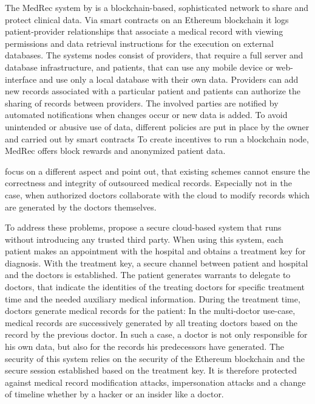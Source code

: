 The MedRec system by \citeauthor{Azaria2016} is a blockchain-based, sophisticated network to share and protect clinical data. Via smart contracts on an Ethereum blockchain it logs patient-provider relationships that associate a medical record with viewing permissions and data retrieval instructions for the execution on external databases.
The systems nodes consist of providers, that require a full server and database infrastructure, and patients, that can use any mobile device or web-interface and use only a local database with their own data.
Providers can add new records associated with a particular patient and patients can authorize the sharing of records between providers. The involved parties are notified by automated notifications when changes occur or new data is added. To avoid unintended or abusive use of data, different policies are put in place by the owner and carried out by smart contracts
To create incentives to run a blockchain node, MedRec offers block rewards and anonymized patient data.

\citeauthor{Cao2019} focus on a different aspect and point out, that existing schemes cannot ensure the correctness and integrity of outsourced medical records. Especially not in the case, when authorized doctors collaborate with the cloud to modify records which are generated by the doctors themselves. \cite{Cao2019}

To address these problems, \citeauthor{Cao2019} propose a secure cloud-based system that runs without introducing any trusted third party.
When using this system, each patient makes an appointment with the hospital and obtains a treatment key for diagnosis. With the treatment key, a secure channel between patient and hospital and the doctors is established. 
The patient generates warrants to delegate to doctors, that indicate the identities of the treating doctors for specific treatment time and the needed auxiliary medical information.\cite{Cao2019}
During the treatment time, doctors generate medical records for the patient: In the multi-doctor use-case, medical records are successively generated by all treating doctors based on the record by the previous doctor. In such a case, a doctor is not only responsible for his own data, but also for the records his predecessors have generated. \cite{Cao2019}
The security of this system relies on the security of the Ethereum blockchain and the secure session established based on the treatment key. It is therefore protected against medical record modification attacks, impersonation attacks and a change of timeline whether by a hacker or an insider like a doctor.


